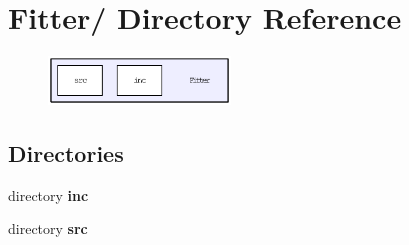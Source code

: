 \section{Fitter/ Directory Reference}
\label{dir_84614226e232585d7074244d970c0b70}


\begin{figure}[H]
\begin{center}
\leavevmode
\includegraphics[width=137pt]{dir_84614226e232585d7074244d970c0b70_dep}
\end{center}
\end{figure}
\subsection*{Directories}
\begin{CompactItemize}
\item 
directory \bf{inc}
\item 
directory \bf{src}
\end{CompactItemize}
